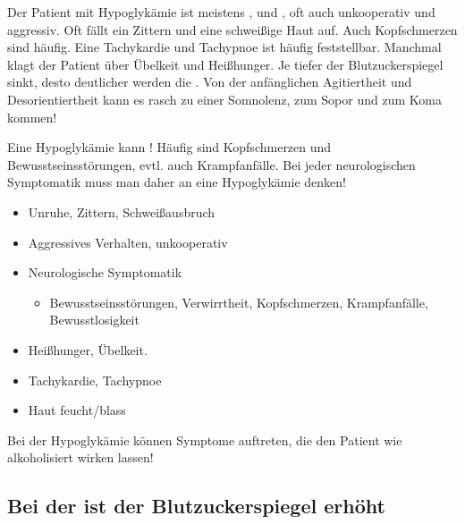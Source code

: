 \TextSlide{\TxSymptome}
{%
Der Patient mit Hypoglykämie ist meistens ,
 und , oft auch unkooperativ und
aggressiv. Oft fällt ein Zittern und eine schweißige Haut
auf. Auch Kopfschmerzen sind häufig. Eine Tachykardie und
Tachypnoe ist häufig feststellbar. Manchmal klagt der
Patient über Übelkeit und Heißhunger.
Je tiefer der Blutzuckerspiegel sinkt, desto deutlicher
werden die . Von der anfänglichen
Agitiertheit und Desorientiertheit kann es rasch zu einer
Somnolenz, zum Sopor und zum Koma kommen!

Eine Hypoglykämie kann   ! Häufig sind Kopfschmerzen und
Bewusstseinsstörungen, evtl. auch Krampfanfälle. Bei jeder
neurologischen Symptomatik muss man daher an eine
Hypoglykämie denken!
}{
\begin{itemize}
  \item Unruhe, Zittern, Schweißausbruch
  \item Aggressives Verhalten, unkooperativ
  \item Neurologische Symptomatik
  \begin{itemize}
    \item Bewusstseinsstörungen, Verwirrtheit, Kopfschmerzen, Krampfanfälle,
    Bewusstlosigkeit
  \end{itemize}
  \item Heißhunger, Übelkeit.
  \item Tachykardie, Tachypnoe
  \item Haut feucht/blass
\end{itemize}
}{}{}{}


\begin{Danger}
  \item Bei der Hypoglykämie können Symptome auftreten, die
  den Patient wie alkoholisiert wirken lassen! 
\end{Danger}

\begin{Synopsis}
\end{Synopsis}




\subsection{Bei der  ist der Blutzuckerspiegel erhöht}
\label{topic:hyperglykaemie}




